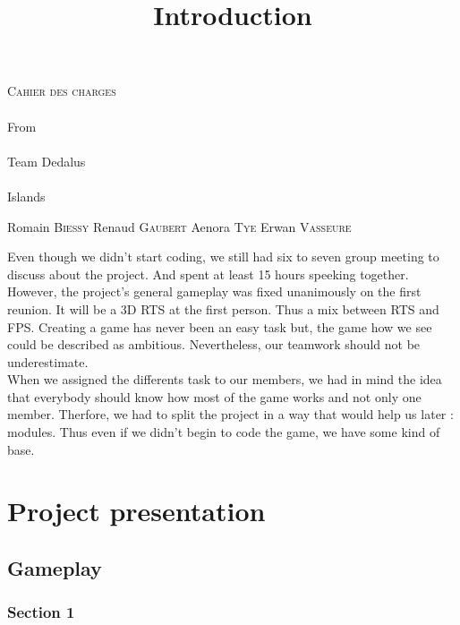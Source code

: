 \documentclass[article]{report}
\begin{document}
		\thispagestyle{empty}
  			\begin{titlepage} 
						\vspace*{5cm} 
  					\begin{center} 
  							{\huge{\textsc{Cahier des charges} \\ ~ \\{\large From}\\ ~\\ Team Dedalus \\ ~ \\ Islands}}
	  						\vspace*{11cm}
						\end{center}
  					\hfill {\large Romain \textsc{Biessy}}
  					\hfill {\large Renaud \textsc{Gaubert}}
  					\hfill {\large Aenora \textsc{Tye}}
  					\hfill {\large Erwan  \textsc{Vasseure}}
  			\end{titlepage} 
  	\renewcommand{\contentsname}{Summary}

  	\tableofcontents
  			\newpage
				\title{Introduction}%
								Even though we didn't start coding, we still had six to seven group meeting to discuss about the project. And spent at least 15 hours speeking together.\newline
								However, the project's general gameplay was fixed unanimously on the first reunion. It will be a 3D RTS at the first person. Thus a mix between RTS and FPS. Creating a game has never been an easy task but, the game how we see could be described as ambitious. Nevertheless, our teamwork should not be underestimate.\\
								
								When we assigned the differents task to our members, we had in mind the idea that everybody should know how most of the game works and not only one member. Therfore, we had to split the project in a way that would help us later : modules. Thus even if we didn't begin to code the game, we have some kind of base. 								
								
				\part{Project presentation}
      			\chapter{Gameplay}
								\section{Section 1}
\end{document}
